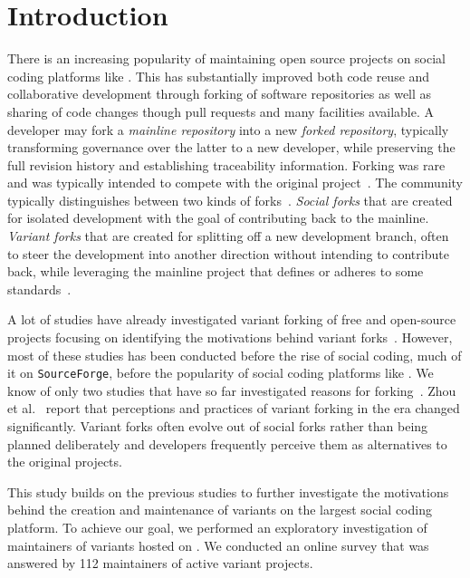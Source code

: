 \section{Introduction}
\label{sec:intro}
There is an increasing popularity of maintaining open source projects on social coding platforms like \gh. This has substantially improved both code reuse and collaborative development through forking of software repositories as well as sharing of code changes though pull requests and many \git facilities available.
A developer may fork a \textit{mainline repository}
into a new \textit{forked repository}, typically transforming governance over the latter to a new developer, while preserving the full revision history and establishing traceability information. 
Forking was rare and was typically intended to compete with the original project~\cite{Linus:2012Perspectives,Gregorio:2012,Viseur:2012Forks,Linus:2013CodeForking,Linus:2011ToFork,Gamalielsson:2014Sustainability}.
The community typically distinguishes between two kinds of forks~\cite{Zhou:2020}.
\textit{Social forks} that are created for isolated development with the goal of contributing back to the mainline. \textit{Variant forks} that are created for splitting off a new development branch, often to steer the development into another direction without intending to contribute back, while leveraging the mainline project that defines or adheres to some standards~\cite{sung:ICSE:2020}.

A lot of studies have already investigated variant forking of free and open-source projects focusing on identifying the motivations behind variant forks~\cite{Linus:2012Perspectives,Gregorio:2012,Viseur:2012Forks,Linus:2013CodeForking,Linus:2011ToFork,Gamalielsson:2014Sustainability}. However, most of these studies has been conducted before the rise of social coding, much of it on \texttt{SourceForge}, before the popularity of social coding platforms like \gh. 
We know of only two studies that have so far investigated reasons for forking~\cite{businge:2018icsme,Zhou:2020}. Zhou et al.~\cite{Zhou:2020} report that perceptions and practices of variant forking in the \gh era changed significantly. Variant forks often evolve out of social forks rather than being planned deliberately and developers frequently perceive them as alternatives to the original projects.

This study builds on the previous studies to further investigate the motivations behind the creation and maintenance of variants on \gh the largest social coding platform. To achieve our goal, we performed an exploratory investigation of maintainers of variants hosted on \gh. We conducted an online survey that was answered by 112 maintainers of active variant projects.


